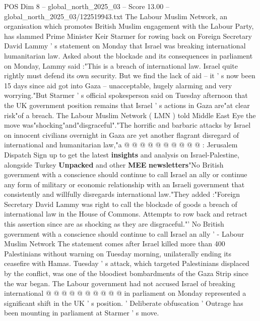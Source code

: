 \begin{textsample}{POS Dim 8 – global\_north\_2025\_03 – Score 13.00 – global\_north\_2025\_03/122519943.txt}  \label{ex:f8_pos_084}
The Labour Muslim Network, an organisation which promotes British Muslim engagement with the Labour Party, has slammed Prime Minister Keir Starmer for rowing back on Foreign Secretary David Lammy ' s statement on Monday that Israel was breaking international humanitarian law.
Asked about the blockade and its consequences in parliament on Monday, Lammy said :"This is a breach of international law.
Israel quite rightly must defend its own security.
But we find the lack of aid -- it ' s now been 15 days since aid got into Gaza -- unacceptable, hugely alarming and very worrying."But Starmer ' s official spokesperson said on Tuesday afternoon that the UK government position remains that Israel ' s actions in Gaza are"at clear risk"of a breach.
The Labour Muslim Network ( LMN ) told Middle East Eye the move was"shocking"and"disgraceful"."The horrific and barbaric attacks by Israel on innocent civilians overnight in Gaza are yet another flagrant disregard of international and humanitarian law,"a @ @ @ @ @ @ @ @ @ @ : Jerusalem Dispatch Sign up to get the latest \textbf{insights} and analysis on Israel-Palestine, alongside Turkey \textbf{Unpacked} and other \textbf{MEE} \textbf{newsletters}"No British government with a conscience should continue to call Israel an ally or continue any form of military or economic relationship with an Israeli government that consistently and willfully disregards international law."They added :"Foreign Secretary David Lammy was right to call the blockade of goods a breach of international law in the House of Commons.
Attempts to row back and retract this assertion since are as shocking as they are disgraceful."' No British government with a conscience should continue to call Israel an ally ' - Labour Muslim Network The statement comes after Israel killed more than 400 Palestinians without warning on Tuesday morning, unilaterally ending its ceasefire with Hamas.
Tuesday ' s attack, which targeted Palestinians displaced by the conflict, was one of the bloodiest bombardments of the Gaza Strip since the war began.
The Labour government had not accused Israel of breaking international @ @ @ @ @ @ @ @ @ @ in parliament on Monday represented a significant shift in the UK ' s position. ' Deliberate obfuscation ' Outrage has been mounting in parliament at Starmer ' s move.

\end{textsample}
